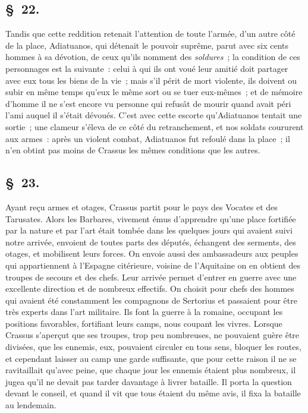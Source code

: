 \documentclass[french,twoside]{book} %
\begin{document}
\subsection[{§ 22.}]{ \textsc{§ 22.} }
\noindent Tandis que cette reddition retenait l’attention de toute l’armée, d’un autre côté de la place, Adiatuanos, qui détenait le pouvoir suprême, parut avec six cents hommes à sa dévotion, de ceux qu’ils nomment des {\itshape soldures} ; la condition de ces personnages est la suivante : celui à qui ils ont voué leur amitié doit partager avec eux tous les biens de la vie ; mais s’il périt de mort violente, ils doivent ou subir en même temps qu’eux le même sort ou se tuer eux-mêmes ; et de mémoire d’homme il ne s’est encore vu personne qui refusât de mourir quand avait péri l’ami auquel il s’était dévoués. C'est avec cette escorte qu’Adiatuanos tentait une sortie ; une clameur s’éleva de ce côté du retranchement, et nos soldats coururent aux armes : après un violent combat, Adiatuanos fut refoulé dans la place ; il n’en obtint pas moins de Crassus les mêmes conditions que les autres.
\subsection[{§ 23.}]{ \textsc{§ 23.} }
\noindent Ayant reçu armes et otages, Crassus partit pour le pays des Vocates et des Tarusates. Alors les Barbares, vivement émus d’apprendre qu’une place fortifiée par la nature et par l’art était tombée dans les quelques jours qui avaient suivi notre arrivée, envoient de toutes parts des députés, échangent des serments, des otages, et mobilisent leurs forces. On envoie aussi des ambassadeurs aux peuples qui appartiennent à l’Espagne citérieure, voisine de l’Aquitaine on en obtient des troupes de secours et des chefs. Leur arrivée permet d’entrer en guerre avec une excellente direction et de nombreux effectifs. On choisit pour chefs des hommes qui avaient été constamment les compagnons de Sertorius et passaient pour être très experts dans l’art militaire. Ils font la guerre à la romaine, occupant les positions favorables, fortifiant leurs camps, nous coupant les vivres. Lorsque Crassus s’aperçut que ses troupes, trop peu nombreuses, ne pouvaient guère être divisées, que les ennemis, eux, pouvaient circuler en tous sens, bloquer les routes, et cependant laisser au camp une garde suffisante, que pour cette raison il ne se ravitaillait qu’avec peine, que chaque jour les ennemis étaient plus nombreux, il jugea qu’il ne devait pas tarder davantage à livrer bataille. Il porta la question devant le conseil, et quand il vit que tous étaient du même avis, il fixa la bataille au lendemain.
\end{document}
